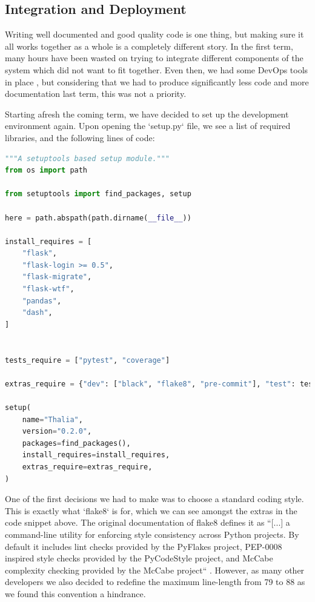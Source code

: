\documentclass[main.tex]{subfiles}
\begin{document}
\subsection{Integration and Deployment}
\label{Coding Standards}

 Writing well documented and good quality code is one thing, but making sure it all works together as a whole is a completely different story. In the first term, many hours have been wasted on trying to integrate different components of the system which did not want to fit together. Even then, we had some DevOps tools in place \cite{DevOps}, but considering that we had to produce significantly less code and more documentation last term, this was not a priority.

 Starting afresh the coming term, we have decided to set up the development environment again. Upon opening the `setup.py` file, we see a list of required libraries, and the following lines of code:

\begin{lstlisting}[language=Python, caption=setup.py - Development environment, label=lst:Development_env]
"""A setuptools based setup module."""
from os import path

from setuptools import find_packages, setup

here = path.abspath(path.dirname(__file__))

install_requires = [
    "flask",
    "flask-login >= 0.5",
    "flask-migrate",
    "flask-wtf",
    "pandas",
    "dash",
]


tests_require = ["pytest", "coverage"]

extras_require = {"dev": ["black", "flake8", "pre-commit"], "test": tests_require}

setup(
    name="Thalia",
    version="0.2.0",
    packages=find_packages(),
    install_requires=install_requires,
    extras_require=extras_require,
)
\end{lstlisting}

One of the first decisions we had to make was to choose a standard coding style. This is exactly what `flake8` is for, which we can see amongst the extras in the code snippet above. The original documentation of flake8 defines it as ``[...] a command-line utility for enforcing style consistency across Python projects. By default it includes lint checks provided by the PyFlakes project, PEP-0008 inspired style checks provided by the PyCodeStyle project, and McCabe complexity checking provided by the McCabe project`` \cite{flake8}. However, as many other developers we also decided to redefine the maximum line-length from 79 to 88 as we found this convention a hindrance.
\end{document}
